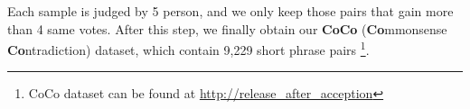 Each sample is judged by 5 person, and we only keep those pairs that gain more than 4 same votes. After this step, we finally obtain our \textbf{CoCo} (\textbf{Co}mmonsense \textbf{Co}ntradiction) dataset, which contain 9,229 short phrase pairs \footnote{CoCo dataset can be found at \url{http://release_after_acception}}.



